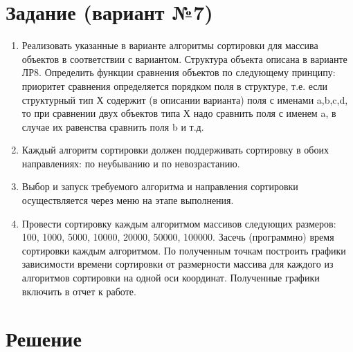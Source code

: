 \documentclass[12pt]{article}
\begin{document}
\section*{Задание (вариант №7)}
\begin{enumerate}
	\item Реализовать указанные в варианте алгоритмы сортировки для массива объектов в  соответствии с вариантом. Структура объекта описана в варианте ЛР8. Определить функции сравнения объектов по следующему принципу: приоритет сравнения определяется порядком поля в структуре, т.е. если структурный тип Х содержит (в описании варианта) поля с именами a,b,c,d, то при сравнении двух объектов типа Х надо сравнить поля с именем a, в случае их равенства сравнить поля b и т.д.
	\item Каждый алгоритм сортировки должен поддерживать сортировку в обоих направлениях: по неубыванию и по невозрастанию.
	\item Выбор и запуск требуемого алгоритма и направления сортировки осуществляется через меню на этапе выполнения.
	\item Провести сортировку каждым алгоритмом массивов следующих размеров: 100, 1000, 5000, 10000, 20000, 50000, 100000. Засечь (программно) время сортировки  каждым алгоритмом. По полученным точкам построить графики зависимости времени сортировки от размерности массива для каждого из алгоритмов сортировки на одной оси координат. Полученные графики включить в отчет к работе.
\end{enumerate}


\newpage


\section*{Решение}

\end{document}
